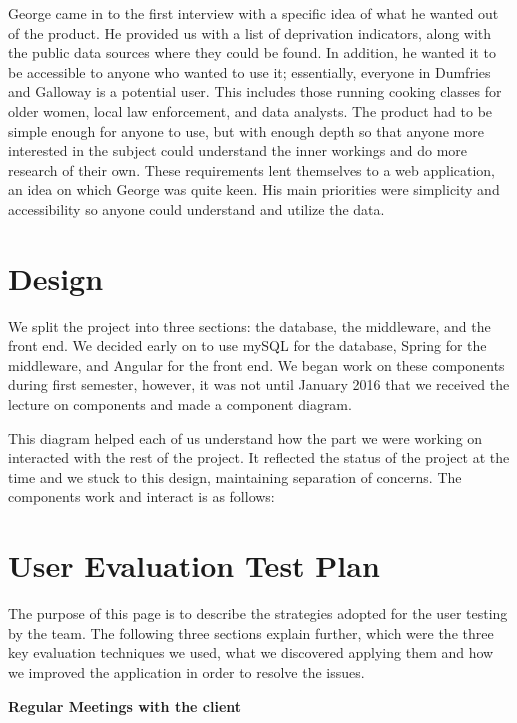 \documentclass{l3proj}
\begin{document}
George came in to the first interview with a specific idea of what he wanted out of the product. He provided us with a list of deprivation indicators, along with the public data sources where they could be found. In addition, he wanted it to be accessible to anyone who wanted to use it; essentially, everyone in Dumfries and Galloway is a potential user. This includes those running cooking classes for older women, local law enforcement, and data analysts. The product had to be simple enough for anyone to use, but with enough depth so that anyone more interested in the subject could understand the inner workings and do more research of their own. These requirements lent themselves to a web application, an idea on which George was quite keen. His main priorities were simplicity and accessibility so anyone could understand and utilize the data.

\section{Design}
\label{designdocs}

We split the project into three sections: the database, the middleware, and the front end. We decided early on to use mySQL for the database, Spring for the middleware, and Angular for the front end. We began work on these components during first semester, however, it was not until January 2016 that we received the lecture on components and made a component diagram.



This diagram helped each of us understand how the part we were working on interacted with the rest of the project. It reflected the status of the project at the time and we stuck to this design, maintaining separation of concerns. The components work and interact is as follows:

\section{User Evaluation Test Plan}
\label{userEvaluationPlan}

The purpose of this page is to describe the strategies adopted for the user testing by the team. The following three sections explain further, which were the three key evaluation techniques we used, what we discovered applying them and how we improved the application in order to resolve the issues.

\textbf{Regular Meetings with the client}
\end{document}
